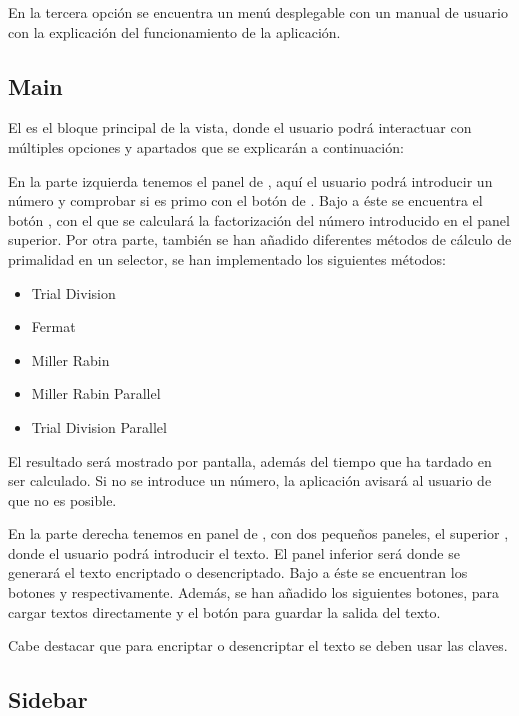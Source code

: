 En la tercera opción se encuentra un menú desplegable con un manual de usuario con la explicación del funcionamiento de la aplicación.
 
\subsection{Main}

El  es el bloque principal de la vista, donde el usuario podrá interactuar con múltiples opciones y apartados que se explicarán a continuación: \bigskip

En la parte izquierda tenemos el panel de , aquí el usuario podrá introducir un número y comprobar si es primo con el botón de . Bajo a éste se encuentra el botón , con el que se calculará la factorización del número introducido en el panel superior. Por otra parte, también se han añadido diferentes métodos de cálculo de primalidad en un selector, se han implementado los siguientes métodos:
\begin{itemize}
    \item Trial Division
    \item Fermat
    \item Miller Rabin
    \item Miller Rabin Parallel
    \item Trial Division Parallel
\end{itemize}
\bigskip

El resultado será mostrado por pantalla, además del tiempo que ha tardado en ser calculado. Si no se introduce un número, la aplicación avisará al usuario de que no es posible.\bigskip

En la parte derecha tenemos en panel de , con dos pequeños paneles, el superior , donde el usuario podrá introducir el texto. El panel inferior  será donde se generará el texto encriptado o desencriptado. Bajo a éste se encuentran los botones  y  respectivamente. Además, se han añadido los siguientes botones,  para cargar textos directamente y el botón  para guardar la salida del texto.\bigskip

Cabe destacar que para encriptar o desencriptar el texto se deben usar las claves.

\subsection{Sidebar}\label{Sidebar}

